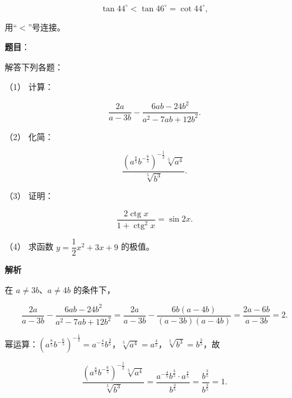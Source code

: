 \begin{answer}
\nopagebreak[4]
\[
\tan 44^\circ<\tan 46^\circ=\cot 44^\circ,
\]

用“$<$”号连接。





\end{answer}
\begin{answer}

\textbf{题目}：

解答下列各题：

（1） 计算：

\nopagebreak[4]
\[
\frac{2a}{a-3b}-\frac{6ab-24b^2}{a^2-7ab+12b^2}.
\]

（2） 化简：

\nopagebreak[4]
\[
\frac{(a^{\frac{8}{5}}b^{-\frac{6}{5}})^{-\frac{1}{2}}\sqrt[5]{a^4}}{\sqrt[5]{b^3}}.
\]

（3） 证明：

\nopagebreak[4]
\[
\frac{2\operatorname{ctg}x}{1+\operatorname{ctg}^2x}=\sin 2x.
\]

（4） 求函数 $y=\dfrac{1}{2}x^2+3x+9$ 的极值。

\textbf{解析}


在 $a\ne 3b$、$a\ne 4b$ 的条件下，

\nopagebreak[4]
\[
\frac{2a}{a-3b}-\frac{6ab-24b^{2}}{a^{2}-7ab+12b^{2}}
=\frac{2a}{a-3b}-\frac{6b(a-4b)}{(a-3b)(a-4b)}
=\frac{2a-6b}{a-3b}=2.
\]


幂运算：$\left(a^{\frac{8}{5}}b^{-\frac{6}{5}}\right)^{-\frac{1}{2}}=a^{-\frac{4}{5}}b^{\frac{3}{5}}$，$\sqrt[5]{a^{4}}=a^{\frac{4}{5}}$，$\sqrt[5]{b^{3}}=b^{\frac{3}{5}}$，故

\nopagebreak[4]
\[
\frac{(a^{\frac{8}{5}}b^{-\frac{6}{5}})^{-\frac{1}{2}}\sqrt[5]{a^{4}}}{\sqrt[5]{b^{3}}}
=\frac{a^{-\frac{4}{5}}b^{\frac{3}{5}}\cdot a^{\frac{4}{5}}}{b^{\frac{3}{5}}}
=\frac{b^{\frac{3}{5}}}{b^{\frac{3}{5}}}=1.
\]


\end{answer}
